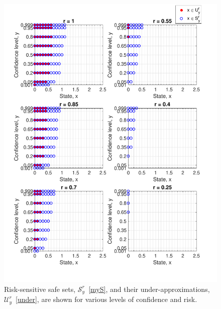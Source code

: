 \documentclass[letterpaper, 10 pt, conference]{ieeeconf}  %
\begin{document}
\begin{figure}[thpb]
      \centering
      \includegraphics[scale=0.5]{output_CompareScript_Sept112018.pdf}
      \caption{ Risk-sensitive safe sets, $\mathcal{S}_y^r$~\eqref{myS}, and their under-approximations, $\mathcal{U}_y^r$~\eqref{under},
		are shown for various levels of confidence and risk. } 
      \label{compare}
\end{figure}
\end{document}

